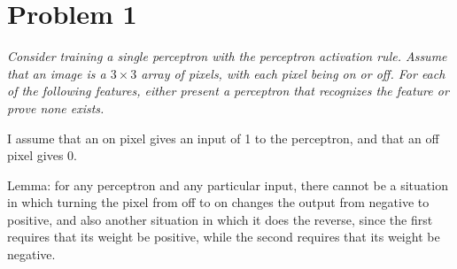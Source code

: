 \documentclass{article}
\begin{document}
  \section*{Problem 1}
  \textit{Consider training a single perceptron with the perceptron
    activation rule.  Assume that an image is a $3\times 3$ array of
    pixels, with each pixel being on or off. For each of the following
    features, either present a perceptron that recognizes the feature
    or prove none exists.}

  I assume that an on pixel gives an input of 1 to the perceptron, and
  that an off pixel gives 0.

  Lemma: for any perceptron and any particular input, there cannot be
  a situation in which turning the pixel from off to on changes the
  output from negative to positive, and also another situation in
  which it does the reverse, since the first requires that its weight
  be positive, while the second requires that its weight be negative.
\end{document}
